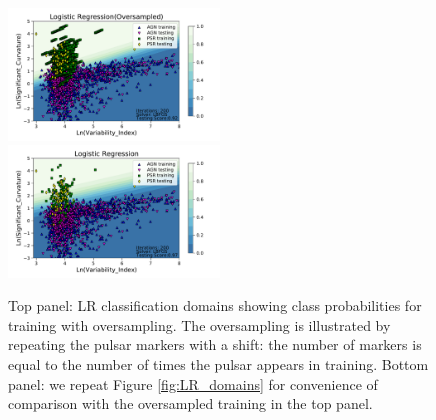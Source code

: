 \begin{figure}[h]
\includegraphics[width=0.5\textwidth]{plots/classification_domains/lr_200_lbfgs_oversample.pdf}
\includegraphics[width=0.5\textwidth]{plots/classification_domains/lr_200_lbfgs.pdf}
\caption{Top panel: LR classification domains showing class probabilities for training with oversampling.
The oversampling is illustrated by repeating the pulsar markers with a shift: the number of markers is equal to the number of times the pulsar appears in training.
Bottom panel: we repeat Figure \ref{fig:LR_domains} for convenience of comparison with the oversampled training in the top panel.
}  
\label{fig:LR_domains_O}
\end{figure}
